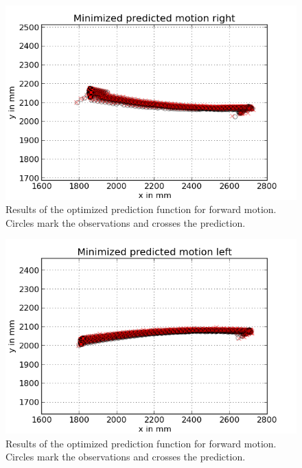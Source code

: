 \documentclass{scrartcl}
\begin{document}
\begin{figure}[H]
\centering
\begin{minipage}{.5\textwidth}
  \centering
  \includegraphics[width=1\linewidth]{img/mini_predict_right_1.png}
\end{minipage}%

\caption{Results of the optimized prediction function for forward motion. Circles mark the observations and crosses the prediction.}
\label{fig:prediction}
\end{figure}

\begin{figure}[H]
\centering
\begin{minipage}{.5\textwidth}
  \centering
  \includegraphics[width=1\linewidth]{img/mini_predict_left_1.png}
\end{minipage}%

\caption{Results of the optimized prediction function for forward motion. Circles mark the observations and crosses the prediction.}
\label{fig:prediction}
\end{figure}
\end{document}
